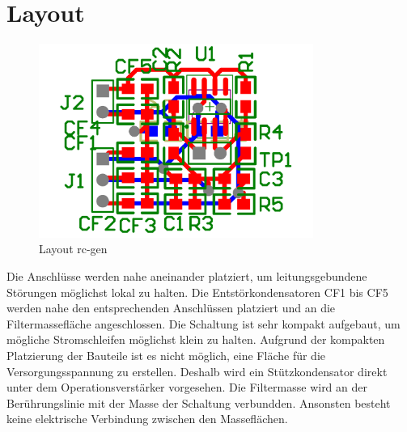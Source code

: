 \documentclass[a4paper,10pt,fleqn]{article}
\begin{document}
\section{Layout}
\begin{figure}[h!]
    \centering
    \includegraphics[width=0.8\textwidth]{../rc-gen/rc-gen-pcb.PDF}
    \caption{Layout rc-gen}
    \label{fig:layout}
\end{figure}
\noindent
Die Anschlüsse werden nahe aneinander platziert, um leitungsgebundene 
Störungen möglichst lokal zu halten. Die Entstörkondensatoren CF1 bis CF5 
werden nahe den entsprechenden Anschlüssen platziert und an die 
Filtermassefläche angeschlossen. Die Schaltung ist sehr kompakt aufgebaut, um 
mögliche Stromschleifen möglichst klein zu halten. Aufgrund der kompakten 
Platzierung der Bauteile ist es nicht möglich, eine Fläche für die 
Versorgungsspannung zu erstellen. Deshalb wird ein Stützkondensator direkt 
unter dem Operationsverstärker vorgesehen. Die Filtermasse wird an der 
Berührungslinie mit der Masse der Schaltung verbundden. Ansonsten besteht 
keine elektrische Verbindung zwischen den Masseflächen. 
\end{document}
